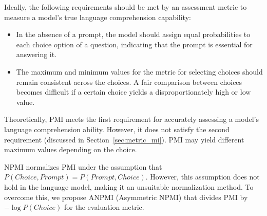Ideally, the following requirements should be met by an assessment metric to measure a model's true language comprehension capability:
\begin{itemize}
\item In the absence of a prompt, the model should assign equal probabilities to each choice option of a question, indicating that the prompt is essential for answering it. 
\item The maximum and minimum values for the metric for selecting choices should remain consistent across the choices. 
A fair comparison between choices becomes difficult if a certain choice yields a disproportionately high or low value. 
\end{itemize}

Theoretically, PMI meets the first requirement for accurately assessing a model's language comprehension ability. However, it does not satisfy the second requirement (discussed in Section~\ref{sec:metric_mi}). PMI may yield different maximum values depending on the choice. 

{NPMI normalizes PMI under the assumption that \hbox{\small $P(Choice,Prompt) = P(Prompt,Choice)$}. However, this assumption does not hold in the language model, making it an unsuitable normalization method.}
To overcome this, we propose ANPMI (Asymmetric NPMI) that {divides} PMI by {\small $  -\log P(Choice)$} for the evaluation metric.


